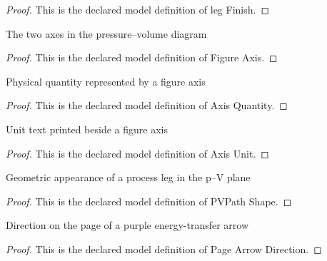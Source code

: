 \begin{proof}
  This is the declared model definition of leg Finish.
\end{proof}
\begin{definition}
  \label{def:physics:phyx-mini-0422:phyxminiproblems-problemphyxmini0422-figureaxis}
  The two axes in the pressure--volume diagram
\end{definition}
\begin{proof}
  This is the declared model definition of Figure Axis.
\end{proof}
\begin{definition}
  \label{def:physics:phyx-mini-0422:phyxminiproblems-problemphyxmini0422-axisquantity}
  Physical quantity represented by a figure axis
\end{definition}
\begin{proof}
  This is the declared model definition of Axis Quantity.
\end{proof}
\begin{definition}
  \label{def:physics:phyx-mini-0422:phyxminiproblems-problemphyxmini0422-axisunit}
  Unit text printed beside a figure axis
\end{definition}
\begin{proof}
  This is the declared model definition of Axis Unit.
\end{proof}
\begin{definition}
  \label{def:physics:phyx-mini-0422:phyxminiproblems-problemphyxmini0422-pvpathshape}
  Geometric appearance of a process leg in the p--V plane
\end{definition}
\begin{proof}
  This is the declared model definition of PVPath Shape.
\end{proof}
\begin{definition}
  \label{def:physics:phyx-mini-0422:phyxminiproblems-problemphyxmini0422-pagearrowdirection}
  Direction on the page of a purple energy-transfer arrow
\end{definition}
\begin{proof}
  This is the declared model definition of Page Arrow Direction.
\end{proof}

